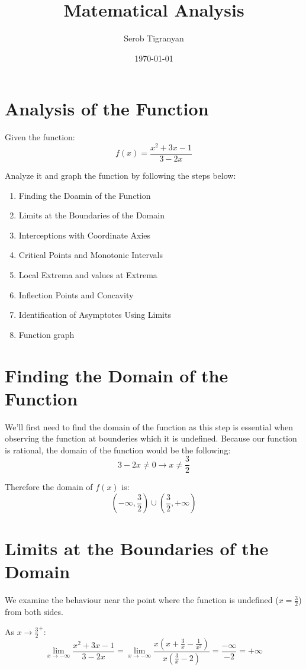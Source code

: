 \documentclass[11pt]{article}
\author{Serob Tigranyan}
\date{\today}
\title{Matematical Analysis}
\begin{document}
\maketitle
\tableofcontents

\newpage
\section{Analysis of the Function}
\label{sec:orgbe1a21b}
Given the function:
\[
f(x)=\frac{x^2+3x-1}{3-2x}
\]

Analyze it and graph the function by following the steps below:
\begin{enumerate}
\item Finding the Doamin of the Function
\item Limits at the Boundaries of the Domain
\item Interceptions with Coordinate Axies
\item Critical Points and Monotonic Intervals
\item Local Extrema and values at Extrema
\item Inflection Points and Concavity
\item Identification of Asymptotes Using Limits
\item Function graph
\end{enumerate}
\section{Finding the Domain of the Function}
\label{sec:org42ba994}
We'll first need to find the domain of the function as this step is essential when observing the function at bounderies which it is undefined.
Because our function is rational, the domain of the function would be the following:
\[
3-2x \neq 0 \rightarrow x \neq \frac{3}{2}
\]

Therefore the domain of \(f(x)\) is:
\[
\left(-\infty, \frac{3}{2} \right) \cup \left( \frac{3}{2}, +\infty \right)
\]

\newpage
\section{Limits at the Boundaries of the Domain}
\label{sec:org24a052b}
We examine the behaviour near the point where the function is undefined (\(x=\frac{3}{2}\)) from both sides.

As \(x \to \frac{3}{2}^+\):
\[
\lim_{x \to -\infty} \frac{x^2+3x-1}{3-2x} = \lim_{x \to -\infty} \frac{x \left( x + \frac{3}{x} - \frac{1}{x^2} \right)}{ x \left( \frac{3}{x} - 2 \right) } = \frac{-\infty}{-2} = +\infty
\]
\end{document}
